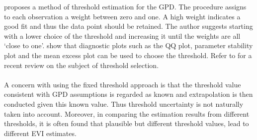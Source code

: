 \cite{dupuis1999exceedances} proposes a method of threshold estimation for the GPD. The procedure assigns to each observation a weight between zero and one. A high weight indicates a good fit and thus the data point should be retained. The author suggests starting with a lower choice of the threshold and increasing it until the weights are all `close to one'. \cite{coles2001introduction} show that diagnostic plots such as the QQ plot, parameter stability plot and the mean excess plot can be used to choose the threshold. Refer to \cite{caeiro2015threshold} for a recent review on the subject of threshold selection.
\\\\
A concern with using the fixed threshold approach is that the threshold value consistent with GPD assumptions is regarded as known and extrapolation is then conducted given this known value. Thus threshold uncertainty is not naturally taken into account. Moreover, in comparing the estimation results from different thresholds, it is often found that plausible but different threshold values, lead to different EVI estimates.

